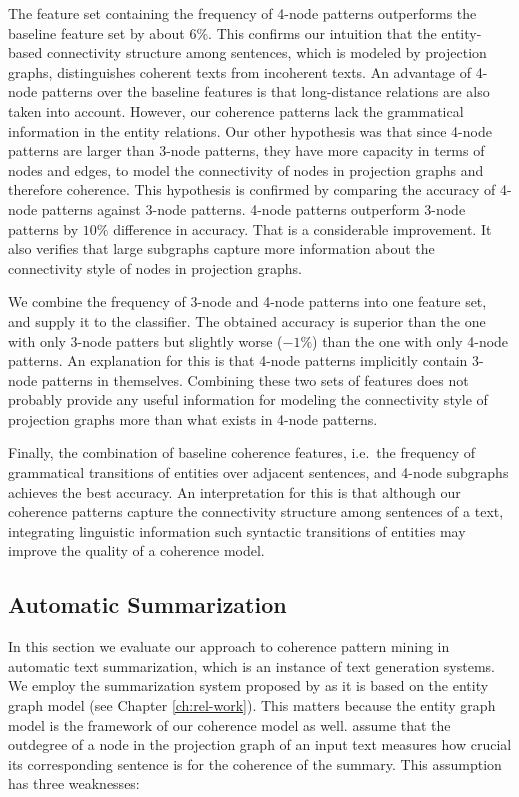 The feature set containing the frequency of 4-node patterns outperforms the baseline feature set by about $6\%$. 
This confirms our intuition that the entity-based connectivity structure among sentences, which is modeled by projection graphs, distinguishes coherent texts from incoherent texts. 
An advantage of 4-node patterns over the baseline features is that long-distance relations are also taken into account. 
However, our coherence patterns lack the grammatical information in the entity relations. 
Our other hypothesis was that since 4-node patterns are larger than 3-node patterns, they have more capacity in terms of nodes and edges, to model the connectivity of nodes in projection graphs and therefore coherence. 
This hypothesis is confirmed by comparing the accuracy of 4-node patterns against 3-node patterns.
4-node patterns outperform 3-node patterns by $10\%$ difference in accuracy. 
That is a considerable improvement. 
It also verifies that large subgraphs capture more information about the connectivity style of nodes in projection graphs.    

We combine the frequency of 3-node and 4-node patterns into one feature set, and supply it to the classifier.   
The obtained accuracy is superior than the one with only 3-node patters but slightly worse  ($-1\%$) than the one with only 4-node patterns. 
An explanation for this is that 4-node patterns implicitly contain 3-node patterns in themselves. 
Combining these two sets of features does not probably provide any useful information for modeling the connectivity style of projection graphs more than what exists in 4-node patterns. 

Finally, the combination of baseline coherence features, i.e.\ the frequency of grammatical transitions of entities over adjacent sentences, and 4-node subgraphs achieves the best accuracy. 
An interpretation for this is that although our coherence patterns capture the connectivity structure among sentences of a text, integrating linguistic information such syntactic transitions of entities may improve the quality of a coherence model.  

\subsection{Automatic Summarization}
\label{sec:auto-summarization}
In this section we evaluate our approach to coherence pattern mining in automatic text summarization, which is an instance of text generation systems. 
We employ the summarization system proposed by  as it is based on the entity graph model (see Chapter \ref{ch:rel-work}). 
This matters because the entity graph model is the framework of our coherence model as well.  
 assume that the outdegree of a node in the projection graph of an input text measures how crucial its corresponding sentence is for the coherence of the summary.  
This assumption has three weaknesses: 

